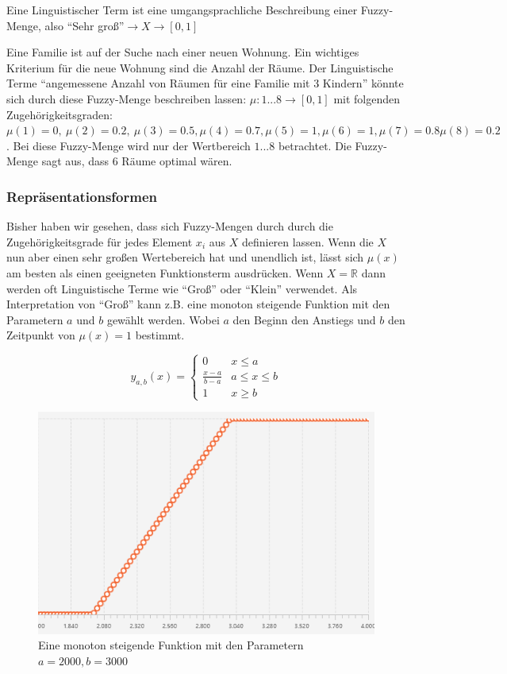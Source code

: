 \documentclass[12pt,a4paper,bibliography=totocnumbered,listof=totocnumbered]{scrartcl}
\theoremstyle{Umgebung}
\begin{document}
\begin{defnt}
Eine Linguistischer Term ist eine umgangsprachliche Beschreibung einer Fuzzy-Menge, also \enquote{Sehr groß}$\rightarrow X \rightarrow \left[0,1\right]$
\end{defnt}


\begin{bsp} 
Eine Familie ist auf der Suche nach einer neuen Wohnung. Ein wichtiges Kriterium für die neue Wohnung sind die Anzahl der Räume. Der Linguistische Terme \enquote{angemessene Anzahl von Räumen für eine Familie mit 3 Kindern} könnte sich durch diese Fuzzy-Menge beschreiben lassen: $\mu: {1...8} \rightarrow  \left[0,1\right]$ mit folgenden Zugehörigkeitsgraden: $\mu(1) = 0,\:\mu(2) = 0.2,\:\mu(3) = 0.5, \mu(4) = 0.7,\mu(5) = 1, \mu(6) = 1, \mu(7) = 0.8
\mu(8) = 0.2$. Bei diese Fuzzy-Menge wird nur der Wertbereich $1...8$ betrachtet. Die Fuzzy-Menge sagt aus, dass 6 Räume optimal wären.
\end{bsp} 

\label{representationsformen}
\subsubsection{Repräsentationsformen}

Bisher haben wir gesehen, dass sich Fuzzy-Mengen durch durch die Zugehörigkeitsgrade für jedes Element $x_i$ aus $X$ definieren lassen. Wenn die $X$ nun aber einen sehr großen Wertebereich hat und unendlich ist, lässt sich $\mu(x)$ am besten als einen geeigneten Funktionsterm ausdrücken. Wenn $X = \mathbb{R}$ dann werden oft Linguistische Terme wie \enquote{Groß} oder \enquote{Klein} verwendet. Als Interpretation von \enquote{Groß} kann z.B. eine monoton steigende Funktion mit den Parametern $a$ und $b$ gewählt werden. Wobei $a$ den Beginn den Anstiegs und $b$ den Zeitpunkt von $\mu(x) = 1$ bestimmt.

\begin{equation}
y_{a,b}(x)=\begin{cases}
0				& x \leq a \\
\frac{x-a}{b-a} & a \leq x \leq b \\
1 				& x \geq b 
\end{cases}
\end{equation}


\begin{figure}
	\centering
	\includegraphics[width=0.5\linewidth]{img/opentriangle}
	\caption{Eine monoton steigende Funktion mit den Parametern $a=2000, b = 3000$}
	\label{fig:opentriangle}
\end{figure}
\end{document}
